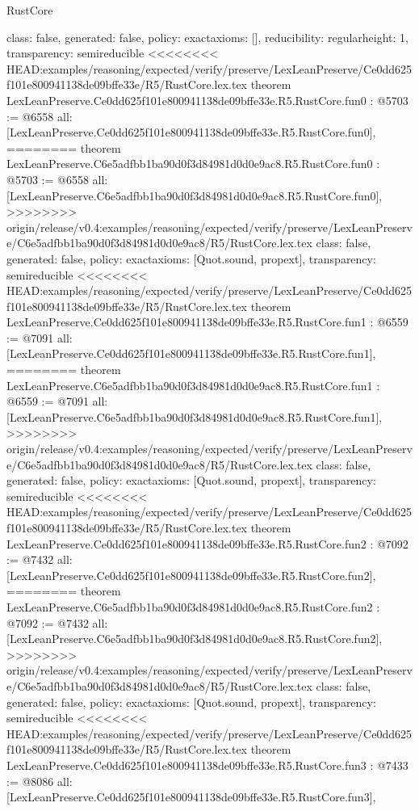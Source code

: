 \begin{lexlean}{RustCore}
\begin{coremodule}
{\begin{coremodule}
{{{  class: false,
  generated: false,
  policy: exact{axioms: []},
  reducibility: regular{height: 1},
  transparency: semireducible
}
<<<<<<<< HEAD:examples/reasoning/expected/verify/preserve/LexLeanPreserve/Ce0dd625f101e800941138de09bffe33e/R5/RustCore.lex.tex
theorem LexLeanPreserve.Ce0dd625f101e800941138de09bffe33e.R5.RustCore.fun0 : @5703 := @6558 {
  all: [LexLeanPreserve.Ce0dd625f101e800941138de09bffe33e.R5.RustCore.fun0],
========
theorem LexLeanPreserve.C6e5adfbb1ba90d0f3d84981d0d0e9ac8.R5.RustCore.fun0 : @5703 := @6558 {
  all: [LexLeanPreserve.C6e5adfbb1ba90d0f3d84981d0d0e9ac8.R5.RustCore.fun0],
>>>>>>>> origin/release/v0.4:examples/reasoning/expected/verify/preserve/LexLeanPreserve/C6e5adfbb1ba90d0f3d84981d0d0e9ac8/R5/RustCore.lex.tex
  class: false,
  generated: false,
  policy: exact{axioms: [Quot.sound, propext]},
  transparency: semireducible
}
<<<<<<<< HEAD:examples/reasoning/expected/verify/preserve/LexLeanPreserve/Ce0dd625f101e800941138de09bffe33e/R5/RustCore.lex.tex
theorem LexLeanPreserve.Ce0dd625f101e800941138de09bffe33e.R5.RustCore.fun1 : @6559 := @7091 {
  all: [LexLeanPreserve.Ce0dd625f101e800941138de09bffe33e.R5.RustCore.fun1],
========
theorem LexLeanPreserve.C6e5adfbb1ba90d0f3d84981d0d0e9ac8.R5.RustCore.fun1 : @6559 := @7091 {
  all: [LexLeanPreserve.C6e5adfbb1ba90d0f3d84981d0d0e9ac8.R5.RustCore.fun1],
>>>>>>>> origin/release/v0.4:examples/reasoning/expected/verify/preserve/LexLeanPreserve/C6e5adfbb1ba90d0f3d84981d0d0e9ac8/R5/RustCore.lex.tex
  class: false,
  generated: false,
  policy: exact{axioms: [Quot.sound, propext]},
  transparency: semireducible
}
<<<<<<<< HEAD:examples/reasoning/expected/verify/preserve/LexLeanPreserve/Ce0dd625f101e800941138de09bffe33e/R5/RustCore.lex.tex
theorem LexLeanPreserve.Ce0dd625f101e800941138de09bffe33e.R5.RustCore.fun2 : @7092 := @7432 {
  all: [LexLeanPreserve.Ce0dd625f101e800941138de09bffe33e.R5.RustCore.fun2],
========
theorem LexLeanPreserve.C6e5adfbb1ba90d0f3d84981d0d0e9ac8.R5.RustCore.fun2 : @7092 := @7432 {
  all: [LexLeanPreserve.C6e5adfbb1ba90d0f3d84981d0d0e9ac8.R5.RustCore.fun2],
>>>>>>>> origin/release/v0.4:examples/reasoning/expected/verify/preserve/LexLeanPreserve/C6e5adfbb1ba90d0f3d84981d0d0e9ac8/R5/RustCore.lex.tex
  class: false,
  generated: false,
  policy: exact{axioms: [Quot.sound, propext]},
  transparency: semireducible
}
<<<<<<<< HEAD:examples/reasoning/expected/verify/preserve/LexLeanPreserve/Ce0dd625f101e800941138de09bffe33e/R5/RustCore.lex.tex
theorem LexLeanPreserve.Ce0dd625f101e800941138de09bffe33e.R5.RustCore.fun3 : @7433 := @8086 {
  all: [LexLeanPreserve.Ce0dd625f101e800941138de09bffe33e.R5.RustCore.fun3],
}}}}}}
\end{coremodule}}
\end{coremodule}
\end{lexlean}
